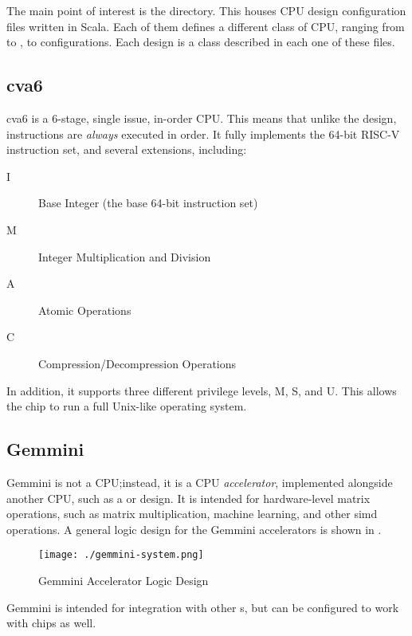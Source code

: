 The main point of interest is the  directory.
This houses CPU design configuration files written in Scala.
Each of them defines a different class of CPU, ranging from  to , to  configurations.
Each design is a class described in each one of these files.

\subsection{cva6}\label{sec:cva6_Generator}
\nocite{cva6Github}
\nocite{zaruba2019cost}
cva6 is a 6-stage, single issue, in-order CPU.\@
This means that unlike the  design, instructions are \emph{always} executed in order.
It fully implements the 64-bit RISC-V instruction set, and several extensions, including:
\begin{description}
\item[I] Base Integer (the base 64-bit instruction set)
\item[M] Integer Multiplication and Division
\item[A] Atomic Operations
\item[C] Compression/Decompression Operations
\end{description}
In addition, it supports three different privilege levels, M, S, and U.
This allows the chip to run a full Unix-like operating system.

\subsection{Gemmini}\label{sec:Gemmini_Generator}
\nocite{gemminiGithub}
\nocite{gemminiPaper}
Gemmini is not a CPU;\@ instead, it is a CPU \emph{accelerator}, implemented alongside another CPU, such as a  or  design.
It is intended for hardware-level matrix operations, such as matrix multiplication, machine learning, and other \gls{simd} operations.
A general logic design for the Gemmini accelerators is shown in .

\begin{figure}[h!tbp]
  \centering
  \texttt{[image: ./gemmini-system.png]}
  \caption{Gemmini Accelerator Logic Design \parencite{gemminiGithub}}
  \label{fig:Gemmini_Accelerator}
\end{figure}

Gemmini is intended for integration with other s, but can be configured to work with  chips as well.


